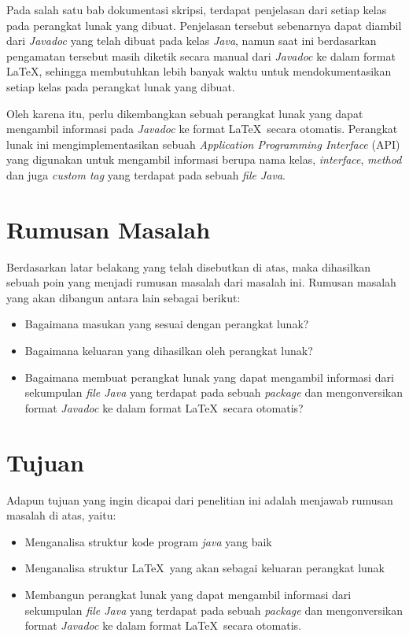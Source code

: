 Pada salah satu bab dokumentasi skripsi, terdapat penjelasan dari setiap kelas pada perangkat lunak yang dibuat. Penjelasan tersebut sebenarnya dapat diambil dari {\it Javadoc} yang telah dibuat pada kelas {\it Java}, namun saat ini berdasarkan pengamatan tersebut masih diketik secara manual dari {\it Javadoc} ke dalam format \LaTeX, sehingga membutuhkan lebih banyak waktu untuk mendokumentasikan setiap kelas pada perangkat lunak yang dibuat.

Oleh karena itu, perlu dikembangkan sebuah perangkat lunak yang dapat mengambil informasi pada {\it Javadoc} ke format \LaTeX\ secara otomatis. Perangkat lunak ini mengimplementasikan sebuah {\it Application Programming Interface} (API) yang digunakan untuk mengambil informasi berupa nama kelas, {\it interface}, {\it method} dan juga {\it custom tag} yang terdapat pada sebuah {\it file Java}.

\section{Rumusan Masalah}
\label{sec:rumusan}
Berdasarkan latar belakang yang telah disebutkan di atas, maka dihasilkan sebuah poin yang menjadi rumusan masalah dari masalah ini. Rumusan masalah yang akan dibangun antara lain sebagai berikut:
\begin{itemize}
    \item Bagaimana masukan yang sesuai dengan perangkat lunak?
    \item Bagaimana keluaran yang dihasilkan oleh perangkat lunak?
	\item Bagaimana membuat perangkat lunak yang dapat mengambil informasi dari sekumpulan {\it file Java} yang terdapat pada sebuah {\it package} dan mengonversikan format {\it Javadoc} ke dalam format \LaTeX\ secara otomatis?
\end{itemize}

\section{Tujuan}
\label{sec:tujuan}
Adapun tujuan yang ingin dicapai dari penelitian ini adalah menjawab rumusan masalah di atas, yaitu:
\begin{itemize}
    \item Menganalisa struktur kode program {\it java} yang baik
    \item Menganalisa struktur \LaTeX\ yang akan sebagai keluaran perangkat lunak
	\item Membangun perangkat lunak yang dapat mengambil informasi dari sekumpulan {\it file Java} yang terdapat pada sebuah {\it package} dan mengonversikan format {\it Javadoc} ke dalam format \LaTeX\ secara otomatis.
\end{itemize}

